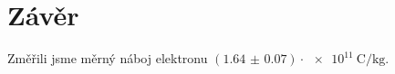 \section*{Závěr}
Změřili jsme měrný náboj elektronu $(\num[separate-uncertainty=true]{1.64(7)})\cdot\SI{e11}{\coulomb\per\kg}$.